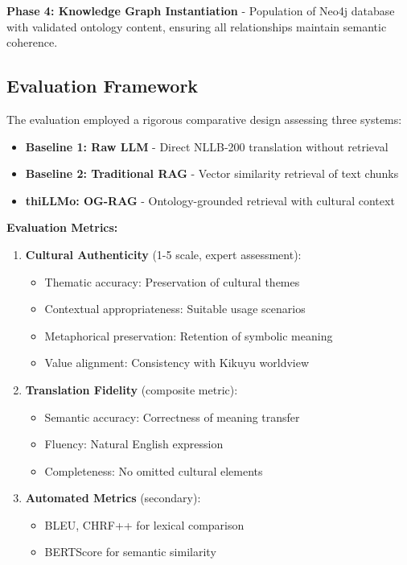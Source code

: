 \documentclass[a4paper,11pt]{article}
\begin{document}
\textbf{Phase 4: Knowledge Graph Instantiation} - Population of Neo4j database with validated ontology content, ensuring all relationships maintain semantic coherence.

\subsection{Evaluation Framework}

The evaluation employed a rigorous comparative design assessing three systems:
\begin{itemize}
    \item \textbf{Baseline 1: Raw LLM} - Direct NLLB-200 translation without retrieval
    \item \textbf{Baseline 2: Traditional RAG} - Vector similarity retrieval of text chunks
    \item \textbf{thiLLMo: OG-RAG} - Ontology-grounded retrieval with cultural context
\end{itemize}

\textbf{Evaluation Metrics:}
\begin{enumerate}
    \item \textbf{Cultural Authenticity} (1-5 scale, expert assessment):
    \begin{itemize}
        \item Thematic accuracy: Preservation of cultural themes
        \item Contextual appropriateness: Suitable usage scenarios
        \item Metaphorical preservation: Retention of symbolic meaning
        \item Value alignment: Consistency with Kikuyu worldview
    \end{itemize}
    
    \item \textbf{Translation Fidelity} (composite metric):
    \begin{itemize}
        \item Semantic accuracy: Correctness of meaning transfer
        \item Fluency: Natural English expression
        \item Completeness: No omitted cultural elements
    \end{itemize}
    
    \item \textbf{Automated Metrics} (secondary):
    \begin{itemize}
        \item BLEU, CHRF++ for lexical comparison
        \item BERTScore for semantic similarity
    \end{itemize}
\end{enumerate}
\end{document}
